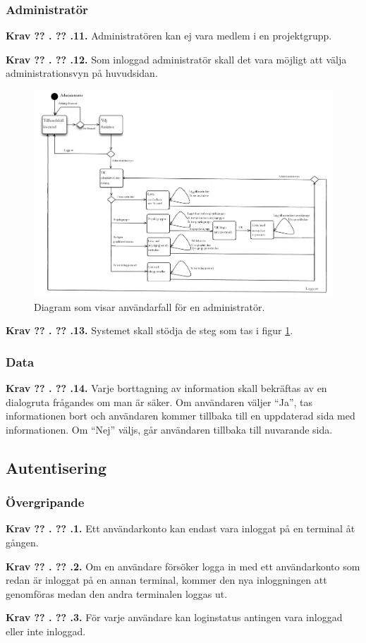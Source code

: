 \documentclass[a4paper]{article}
\newcommand\getcurrentref[1]{%
 \ifnumequal{\value{#1}}{0}
  {??}
  {\the\value{#1}}%
}
\newcommand\requirement[2]{
	\numberedrow{Krav}{#1}{#2}
}
\newcommand\numberedrow[3]{
	\noindent
	\textbf{#1 \getcurrentref{section}.\getcurrentref{subsection}.#2.} #3
	
}
\begin{document}
		\subsubsection*{Administratör}
		\requirement{11}{Administratören kan ej vara medlem i en projektgrupp. }
		\requirement{12}{Som inloggad administratör skall det vara möjligt att välja administrationsvyn på huvudsidan.}
			\begin{figure}[H]
				\centering
				\includegraphics[width=\textwidth]{flow_common_admin}
				\caption{Diagram som visar användarfall för en administratör.}
				\label{image_gen_admin}
			\end{figure}
		\requirement{13}{Systemet skall stödja de steg som tas i figur \ref{image_gen_admin}.}
		\subsubsection*{Data}
		\requirement{14}{Varje borttagning av information skall bekräftas av en dialogruta frågandes om man är säker. Om användaren väljer ``Ja'', tas informationen bort och användaren kommer tillbaka till en uppdaterad sida med informationen. Om ``Nej'' väljs, går användaren tillbaka till nuvarande sida.}
		
		


	\subsection{Autentisering}
		\label{krav-funk-aut}
		\subsubsection*{Övergripande}
			\requirement{1}{Ett användarkonto kan endast vara inloggat på en terminal åt gången.}			
			\requirement{2}{Om en användare försöker logga in med ett användarkonto som redan är inloggat på en annan terminal, kommer den nya inloggningen att genomföras medan den andra terminalen loggas ut.}
			\requirement{3}{För varje användare kan loginstatus antingen vara inloggad eller inte inloggad.}
\end{document}
